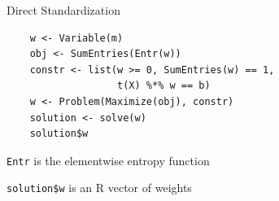 \documentclass{beamer}
\begin{document}
\begin{frame}[fragile]{Direct Standardization}
	\begin{verbatim}
	w <- Variable(m)
	obj <- SumEntries(Entr(w))
	constr <- list(w >= 0, SumEntries(w) == 1, 
				   t(X) %*% w == b)
	w <- Problem(Maximize(obj), constr)
	solution <- solve(w)
	solution$w
	\end{verbatim}
	
	\BIT
		\item \verb|Entr| is the elementwise entropy function
		\item \verb|solution$w| is an R vector of weights
	\EIT
\end{frame}

\end{document}
